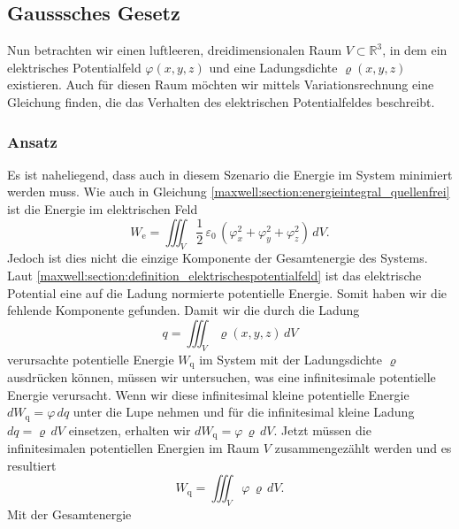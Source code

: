 %
%
%
%
\subsection{Gausssches Gesetz
\label{maxwell:section:elektrostatik_mit_quelle}}
Nun betrachten wir einen luftleeren, dreidimensionalen Raum $V\subset\mathbb{R}^3$, in dem ein elektrisches Potentialfeld $\varphi(x,y,z)$ und eine Ladungsdichte $\varrho(x,y,z)$ existieren.
Auch für diesen Raum möchten wir mittels Variationsrechnung eine Gleichung finden, die das Verhalten des elektrischen Potentialfeldes beschreibt.

\subsubsection{Ansatz}
Es ist naheliegend, dass auch in diesem Szenario die Energie im System minimiert werden muss.
Wie auch in Gleichung \eqref{maxwell:section:energieintegral_quellenfrei} ist die Energie im elektrischen Feld
\[
W_{\text{e}}
=
\iiint_V \frac{1}{2}\,\varepsilon_0\,(\varphi_x^2 + \varphi_y^2 + \varphi_z^2)\, dV.
\]
Jedoch ist dies nicht die einzige Komponente der Gesamtenergie des Systems.
Laut \eqref{maxwell:section:definition_elektrischespotentialfeld} ist das elektrische Potential eine auf die Ladung normierte potentielle Energie.
Somit haben wir die fehlende Komponente gefunden.
Damit wir die durch die Ladung
\begin{equation}
q
=
\iiint_V \varrho(x,y,z)\, dV
\label{maxwell:ladung}
\end{equation}
verursachte potentielle Energie $W_{\text{q}}$ im System mit der Ladungsdichte $\varrho$ ausdrücken können, müssen wir untersuchen, was eine infinitesimale potentielle Energie verursacht.
Wenn wir diese infinitesimal kleine potentielle Energie
\(
dW_{\text{q}}
=
\varphi\, dq
\)
unter die Lupe nehmen und für die infinitesimal kleine Ladung
\(
dq
=
\varrho\, dV
\)
einsetzen, erhalten wir
\(
dW_{\text{q}}
=
\varphi\,\varrho\, dV.
\)
Jetzt müssen die infinitesimalen potentiellen Energien im Raum $V$ zusammengezählt werden und es resultiert
\begin{equation}
W_{\text{q}}
=
\iiint_V \varphi\,\varrho\, dV.
\label{maxwell:section:potenzielle_energie_ladung}
\end{equation}
Mit der Gesamtenergie
